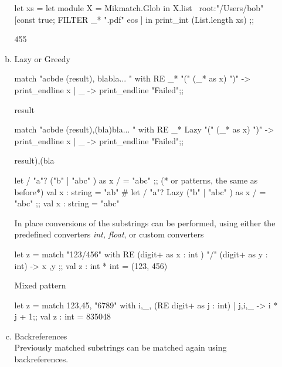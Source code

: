 \begin{enumerate}
\begin{enumerate}[(a)]
\begin{ocamlcode}
let xs =
  let module X = Mikmatch.Glob in
  X.list ~root:"/Users/bob" [const true; FILTER _* ".pdf" eos ]
  in print_int (List.length xs) ;;
\end{ocamlcode}
\begin{ocamlcode}
455
\end{ocamlcode}


\item Lazy or Greedy 

  \begin{ocamlcode}
match "acbde (result), blabla... " with 
RE _* "(" (_* as x) ")" -> print_endline x | _ -> print_endline "Failed";;
\end{ocamlcode}
\begin{ocamlcode}
result
\end{ocamlcode}

\begin{ocamlcode}
 match "acbde (result),(bla)bla... " with 
 RE _* Lazy "(" (_* as x) ")" -> print_endline x | _ -> print_endline "Failed";;
\end{ocamlcode}
\begin{ocamlcode}
result),(bla
\end{ocamlcode}

\begin{alternate}
let / "a"? ("b" | "abc" ) as x / = "abc" ;; (* or patterns, the same as before*)
val x : string = "ab"
# let / "a"? Lazy ("b" | "abc" ) as x / = "abc" ;;
val x : string = "abc"
\end{alternate}

In place conversions of the substrings can be performed, using
either the predefined converters \textit{int, float}, or custom converters

\begin{alternate}
let z  = match "123/456" with RE (digit+ as x : int ) "/" (digit+ as y : int) -> x ,y ;;
val z : int * int = (123, 456)
\end{alternate}

Mixed pattern
\begin{alternate}
let z = match 123,45, "6789" with i,_, (RE digit+ as j : int) | j,i,_ -> i * j + 1;;
val z : int = 835048
\end{alternate}

\item Backreferences \\
  Previously matched substrings can be matched again using backreferences.


\end{enumerate}
\end{enumerate}
